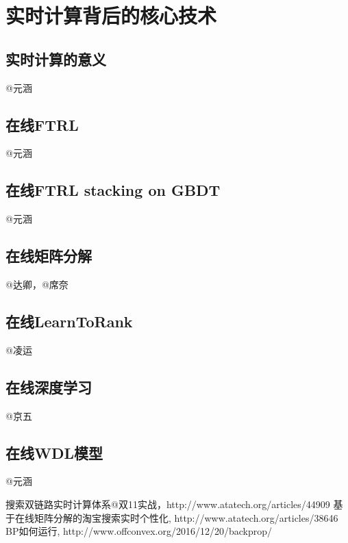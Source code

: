 
\chapter{实时计算背后的核心技术}
\thispagestyle{empty}

\setlength{\fboxrule}{0pt}\setlength{\fboxsep}{0cm}
\noindent\shadowbox{
\begin{tcolorbox}[arc=0mm,colback=lightblue,colframe=darkblue,title=学习目标与要求]

\end{tcolorbox}}
\setlength{\fboxrule}{1pt}\setlength{\fboxsep}{4pt} 

\section{实时计算的意义}
	@元涵
	
\section{在线FTRL}
	@元涵
	
\section{在线FTRL stacking on GBDT}
	@元涵

\section{在线矩阵分解}
	@达卿，@席奈

\section{在线LearnToRank} 
	@凌运 

\section{在线深度学习} 
	@京五

\section{在线WDL模型} 
    @元涵

\begin{thebibliography}{99}
 搜索双链路实时计算体系@双11实战，http://www.atatech.org/articles/44909
 基于在线矩阵分解的淘宝搜索实时个性化, http://www.atatech.org/articles/38646
 BP如何运行, http://www.offconvex.org/2016/12/20/backprop/
\end{thebibliography}

 
